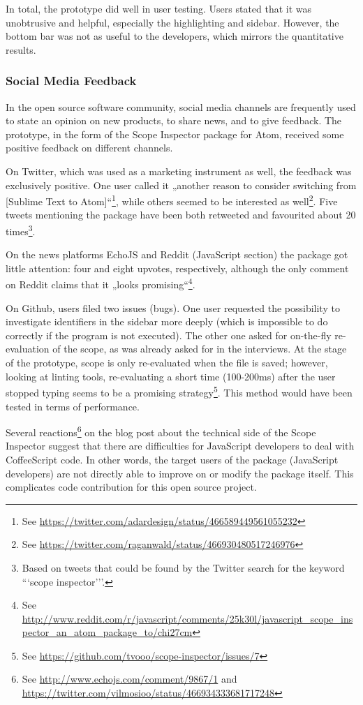 In total, the prototype did well in user testing. Users stated that it
was unobtrusive and helpful, especially the highlighting and sidebar.
However, the bottom bar was not as useful to the developers, which
mirrors the quantitative results.

\subsubsection{Social Media Feedback}\label{social-media-feedback}

In the open source software community, social media channels are
frequently used to state an opinion on new products, to share news, and
to give feedback. The prototype, in the form of the Scope Inspector
package for Atom, received some positive feedback on different channels.

On Twitter, which was used as a marketing instrument as well, the
feedback was exclusively positive. One user called it „another reason to
consider switching from {[}Sublime Text to
Atom{]}“\footnote{See \url{https://twitter.com/adardesign/status/466589449561055232}},
while others seemed to be interested as
well\footnote{See \url{https://twitter.com/raganwald/status/466930480517246976}}.
Five tweets mentioning the package have been both retweeted and
favourited about 20
times\footnote{Based on tweets that could be found by the Twitter search for the keyword ```scope inspector’’’.}.

On the news platforms EchoJS and Reddit (JavaScript section) the package
got little attention: four and eight upvotes, respectively, although the
only comment on Reddit claims that it „looks
promising“\footnote{See \url{http://www.reddit.com/r/javascript/comments/25k30l/javascript_scope_inspector_an_atom_package_to/chi27cm}}.

On Github, users filed two issues (bugs). One user requested the
possibility to investigate identifiers in the sidebar more deeply (which
is impossible to do correctly if the program is not executed). The other
one asked for on-the-fly re-evaluation of the scope, as was already
asked for in the interviews. At the stage of the prototype, scope is
only re-evaluated when the file is saved; however, looking at linting
tools, re-evaluating a short time (100-200ms) after the user stopped
typing seems to be a promising
strategy\footnote{See \url{https://github.com/tvooo/scope-inspector/issues/7}}.
This method would have been tested in terms of performance.

Several
reactions\footnote{See \url{http://www.echojs.com/comment/9867/1} and \url{https://twitter.com/vilmosioo/status/466934333681717248}}
on the blog post about the technical side of the Scope Inspector
\cite{tvo} suggest that there are difficulties for JavaScript developers
to deal with CoffeeScript code. In other words, the target users of the
package (JavaScript developers) are not directly able to improve on or
modify the package itself. This complicates code contribution for this
open source project.
